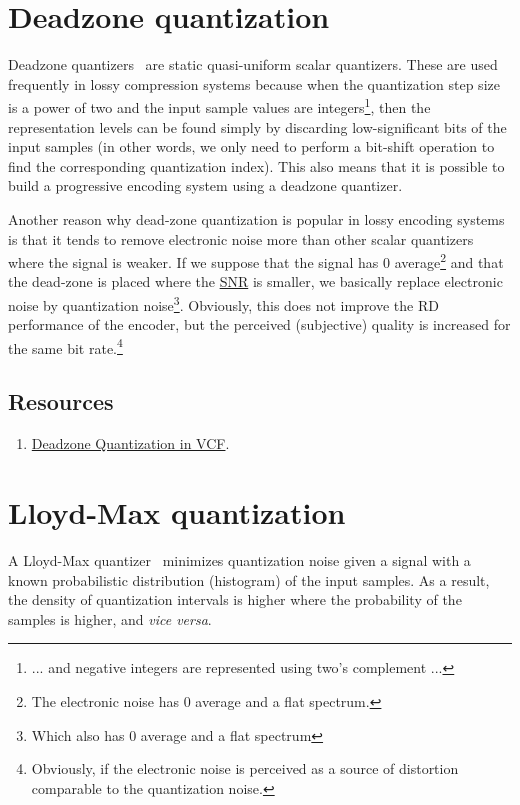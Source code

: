 \section{Deadzone quantization}

Deadzone quantizers~\cite{vruiz__scalar_quantization} are static
quasi-uniform scalar quantizers. These are used frequently in lossy
compression systems because when the quantization step size is a power
of two and the input sample values are integers\footnote{... and negative
integers are represented using two's complement ...}, then the
representation levels can be found simply by discarding
low-significant bits of the input samples (in other words, we only
need to perform a bit-shift operation to find the corresponding
quantization index). This also means that it is possible to build a
progressive encoding system using a deadzone quantizer.

Another reason why dead-zone quantization is popular in lossy encoding
systems is that it tends to remove electronic noise more than other
scalar quantizers where the signal is weaker. If we suppose that the
signal has 0 average\footnote{The electronic noise has 0 average and a
  flat spectrum.} and that the dead-zone is placed where the
\href{https://en.wikipedia.org/wiki/Signal-to-noise_ratio}{SNR} is
smaller, we basically replace electronic noise by quantization
noise\footnote{Which also has 0 average and a flat
  spectrum}. Obviously, this does not improve the RD performance of
the encoder, but the perceived (subjective) quality is increased for
the same bit rate.\footnote{Obviously, if the electronic noise is
  perceived as a source of distortion comparable to the quantization
  noise.}

\subsection*{Resources}
\begin{enumerate}
\item
  \href{https://github.com/Sistemas-Multimedia/VCF/blob/main/src/deadzone.py}{Deadzone
    Quantization in VCF}.
\end{enumerate}

\section{Lloyd-Max quantization}

A Lloyd-Max quantizer~\cite{vruiz__scalar_quantization} minimizes
quantization noise given a signal with a known probabilistic
distribution (histogram) of the input samples. As a result, the
density of quantization intervals is higher where the probability of
the samples is higher, and \textit{vice versa}.

